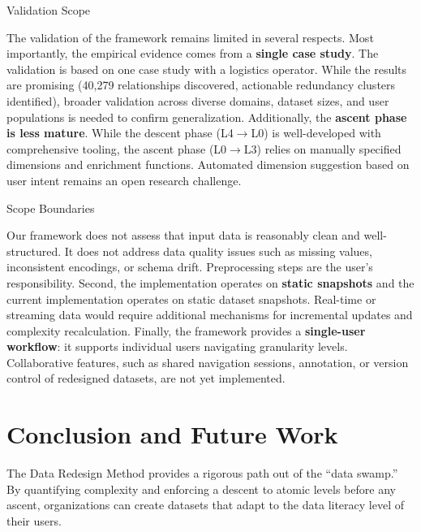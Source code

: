 \documentclass[]{hdsr}
\makeatletter
\def\subsubsection{\@startsection{subsubsection}{3}%
  \z@{.5\linespacing\@plus.7\linespacing}{.5\linespacing}%
  {\normalfont\bfseries}}
\theoremstyle{plain}      %
\theoremstyle{definition} %
\theoremstyle{remark}     %
\makeatother
\begin{document}
\subsubsection{Validation Scope}

The validation of the framework remains limited in several respects. Most importantly, the empirical evidence comes from a \textbf{single case study}. The validation is based on one case study with a logistics operator. While the results are promising (40,279 relationships discovered, actionable redundancy clusters identified), broader validation across diverse domains, dataset sizes, and user populations is needed to confirm generalization. Additionally, the \textbf{ascent phase is less mature}. While the descent phase (L4$\to$L0) is well-developed with comprehensive tooling, the ascent phase (L0$\to$L3) relies on manually specified dimensions and enrichment functions. Automated dimension suggestion based on user intent remains an open research challenge.

\subsubsection{Scope Boundaries}

Our framework does not assess that input data is reasonably clean and well-structured. It does not address data quality issues such as missing values, inconsistent encodings, or schema drift. Preprocessing steps are the user's responsibility. Second, the implementation operates on \textbf{static snapshots} and the current implementation operates on static dataset snapshots. Real-time or streaming data would require additional mechanisms for incremental updates and complexity recalculation. Finally, the framework provides a \textbf{single-user workflow}: it supports individual users navigating granularity levels. Collaborative features, such as shared navigation sessions, annotation, or version control of redesigned datasets, are not yet implemented.

\section{Conclusion and Future Work}
\label{sec:conclusion}

\noindent The Data Redesign Method provides a rigorous path out of the ``data swamp.'' By quantifying complexity and enforcing a descent to atomic levels before any ascent, organizations can create datasets that adapt to the data literacy level of their users.
\end{document}
